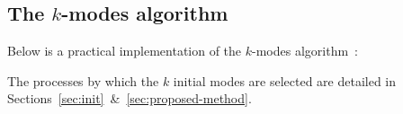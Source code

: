 \subsection{The \(k\)-modes algorithm}\label{subsec:kmodes}

Below is a practical implementation of the \(k\)-modes
algorithm~\cite{Huang1998}:

\begin{singlespace}
    
    \vspace{-5pt}
\end{singlespace}

\begin{remark}
    The processes by which the \(k\) initial modes are selected are detailed in 
    Sections~\ref{sec:init}~\&~\ref{sec:proposed-method}.
\end{remark}
